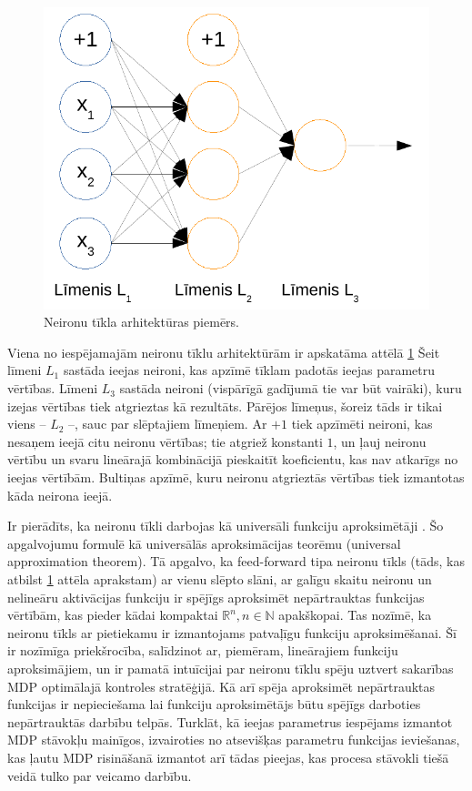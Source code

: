 \documentclass{ludis} %
\begin{document}
\begin{figure}
	\centering
	\includegraphics{Img/nn-arhitektura.pdf}
	\caption{Neironu tīkla arhitektūras piemērs.}
	\label{fig:nn}
\end{figure}

Viena no iespējamajām neironu tīklu arhitektūrām ir apskatāma attēlā \ref{fig:nn}
Šeit līmeni $L_1$ sastāda ieejas neironi, kas apzīmē tīklam padotās ieejas parametru vērtības.
Līmeni $L_3$ sastāda neironi (vispārīgā gadījumā tie var būt vairāki), kuru izejas vērtības tiek atgrieztas kā rezultāts.
Pārējos līmeņus, šoreiz tāds ir tikai viens -- $L_2$ --, sauc par slēptajiem līmeņiem.
Ar $+1$ tiek apzīmēti neironi, kas nesaņem ieejā citu neironu vērtības; tie atgriež konstanti $1$, un ļauj neironu vērtību un svaru lineārajā kombinācijā pieskaitīt koeficientu, kas nav atkarīgs no ieejas vērtībām.
Bultiņas apzīmē, kuru neironu atgrieztās vērtības tiek izmantotas kāda neirona ieejā.

Ir pierādīts, ka neironu tīkli darbojas kā universāli funkciju aproksimētāji \autocite{hornik1991approximation}.
Šo apgalvojumu formulē kā universālās aproksimācijas teorēmu (universal approximation theorem).
Tā apgalvo, ka feed-forward tipa neironu tīkls (tāds, kas atbilst \ref{fig:nn} attēla aprakstam) ar vienu slēpto slāni, ar galīgu skaitu neironu un nelineāru aktivācijas funkciju ir spējīgs aproksimēt nepārtrauktas funkcijas vērtībām, kas pieder kādai kompaktai $\mathbb{R}^n, n \in \mathbb{N}$ apakškopai.
Tas nozīmē, ka neironu tīkls ar pietiekamu ir izmantojams patvaļīgu funkciju aproksimēšanai.
Šī ir nozīmīga priekšrocība, salīdzinot ar, piemēram, lineārajiem funkciju aproksimājiem, un ir pamatā intuīcijai par neironu tīklu spēju uztvert sakarības MDP optimālajā kontroles stratēģijā.
Kā arī spēja aproksimēt nepārtrauktas funkcijas ir nepieciešama lai funkciju aproksimētājs būtu spējīgs darboties nepārtrauktās darbību telpās.
Turklāt, kā ieejas parametrus iespējams izmantot MDP stāvokļu mainīgos, izvairoties no atsevišķas parametru funkcijas ieviešanas, kas ļautu MDP risināšanā izmantot arī tādas pieejas, kas procesa stāvokli tiešā veidā tulko par veicamo darbību.
\end{document}
